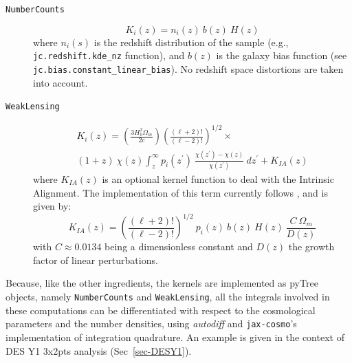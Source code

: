 \documentclass[twocolumn,twocolappendix,nofootinbib,iop]{openjournal}
\newcommand{\FrL}[1]{{\color{cyan}FL: #1}}
\newcommand{\jaxcosmo}{\texttt{jax-cosmo}}
\begin{document}
\begin{description}
\item[\texttt{NumberCounts}]
    \begin{equation}
        K_i(z) = n_i(z)\ b(z)\ H(z)
    \end{equation}
where $n_i(s)$ is the redshift distribution of the sample (e.g., \texttt{jc.redshift.kde\_nz} function), and $b(z)$ is the galaxy bias function (see  \texttt{jc.bias.constant\_linear\_bias}). No redshift space distortions are taken into account.

\item [\texttt{WeakLensing}]
    \begin{multline}
 K_i(z) = \left( \frac{3 H_0^2\Omega_m}{2 c} \right) \left(\frac{(\ell+2)!}{(\ell-2)!} \right)^{1/2}\times 
 \\  (1+z)\ \chi(z) \int_z^\infty p_i(z^\prime)\ \frac{\chi(z^\prime)-\chi(z)}{\chi(z^\prime)}\ dz^\prime + K_{IA}(z)
    \end{multline}
where $K_{IA}(z)$ is an optional kernel function to deal with the Intrinsic Alignment. The implementation of this term currently follows \citet{2011A&A...527A..26J}, and is given by:
\begin{equation}
    K_{IA}(z) =   \left(\frac{(\ell+2)!}{(\ell-2)!}\right)^{1/2}\ p_i(z)\ b(z)\  H(z)\ \frac{C\  \Omega_m}{D(z)}
\end{equation}
with $C\approx 0.0134$ being a dimensionless constant and $D(z)$ the growth factor of linear perturbations.
\end{description}



Because, like the other ingredients, the kernels are implemented as pyTree objects, namely \texttt{NumberCounts} and \texttt{WeakLensing}, all the integrals involved in these computations can be differentiated with respect to the cosmological parameters and the number densities, using \textit{autodiff} and \jaxcosmo's implementation of integration quadrature. An example is given in the context of DES Y1 3x2pts analysis (Sec~\ref{sec-DESY1}).
%
\end{document}
